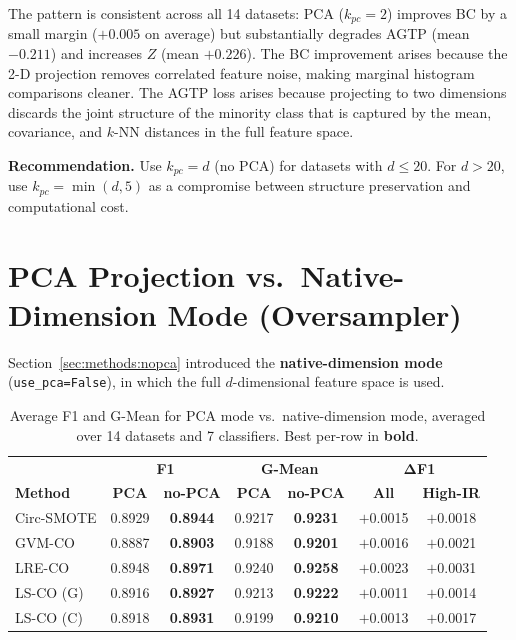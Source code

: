 The pattern is consistent across all 14 datasets: PCA ($k_{pc}=2$) improves BC by a small margin ($+0.005$ on average) but substantially degrades AGTP (mean $-0.211$) and increases $Z$ (mean $+0.226$).
The BC improvement arises because the 2-D projection removes correlated feature noise, making marginal histogram comparisons cleaner.
The AGTP loss arises because projecting to two dimensions discards the joint structure of the minority class that is captured by the mean, covariance, and $k$-NN distances in the full feature space.

\textbf{Recommendation.} Use $k_{pc} = d$ (no PCA) for datasets with $d \leq 20$.
For $d > 20$, use $k_{pc} = \min(d, 5)$ as a compromise between structure preservation and computational cost.


\section{PCA Projection vs.\ Native-Dimension Mode (Oversampler)}
\label{sec:ablation:pca}

Section~\ref{sec:methods:nopca} introduced the \textbf{native-dimension mode} (\texttt{use\_pca=False}), in which the full $d$-dimensional feature space is used.

\begin{table}[H]
\centering
\caption{Average F1 and G-Mean for PCA mode vs.\ native-dimension mode, averaged over 14 datasets and 7 classifiers.
Best per-row in \textbf{bold}.}
\label{tab:abl:pca}
\begin{tabular}{lcc|cc|cc}
\toprule
& \multicolumn{2}{c|}{\textbf{F1}} & \multicolumn{2}{c|}{\textbf{G-Mean}} & \multicolumn{2}{c}{$\boldsymbol{\Delta}$\textbf{F1}} \\
\textbf{Method} & \textbf{PCA} & \textbf{no-PCA} & \textbf{PCA} & \textbf{no-PCA} & \textbf{All} & \textbf{High-IR} \\
\midrule
Circ-SMOTE & 0.8929 & \textbf{0.8944} & 0.9217 & \textbf{0.9231} & $+$0.0015 & $+$0.0018 \\
GVM-CO     & 0.8887 & \textbf{0.8903} & 0.9188 & \textbf{0.9201} & $+$0.0016 & $+$0.0021 \\
LRE-CO     & 0.8948 & \textbf{0.8971} & 0.9240 & \textbf{0.9258} & $+$0.0023 & $+$0.0031 \\
LS-CO (G)  & 0.8916 & \textbf{0.8927} & 0.9213 & \textbf{0.9222} & $+$0.0011 & $+$0.0014 \\
LS-CO (C)  & 0.8918 & \textbf{0.8931} & 0.9199 & \textbf{0.9210} & $+$0.0013 & $+$0.0017 \\
\bottomrule
\end{tabular}
\end{table}

